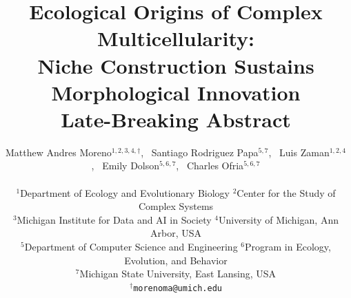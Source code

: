 \title{
    Ecological Origins of Complex Multicellularity:\\Niche Construction Sustains Morphological Innovation
    \\[1ex]{\normalsize\normalfont\mdseries Late-Breaking Abstract}
}

\author{
    Matthew Andres Moreno$^{1,2,3,4,\dagger}$,\ %
    Santiago Rodriguez Papa$^{5,7}$,\ %
    Luis Zaman$^{1,2,4}$,\ %
    Emily Dolson$^{5,6,7}$,\ %
    Charles Ofria$^{5,6,7}$ \\
    \mbox{}\\
    $^1$Department of Ecology and Evolutionary Biology
    $^2$Center for the Study of Complex Systems \\
    $^3$Michigan Institute for Data and AI in Society
    $^4$University of Michigan, Ann Arbor, USA \\
    $^5$Department of Computer Science and Engineering
    $^6$Program in Ecology, Evolution, and Behavior \\
    $^7$Michigan State University, East Lansing, USA \\
    $^\dagger$\texttt{morenoma@umich.edu}
}

\maketitle

